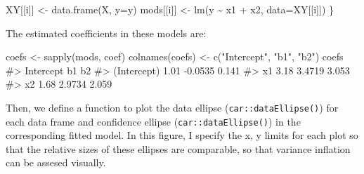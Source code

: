 \documentclass[
  letterpaper,
  10pt,
  krantz2]{krantz}
\makeatletter
\newenvironment{Shaded}{\begin{snugshade}}{\end{snugshade}}
\newcommand{\AttributeTok}[1]{\textcolor[rgb]{0.40,0.45,0.13}{#1}}
\newcommand{\CommentTok}[1]{\textcolor[rgb]{0.37,0.37,0.37}{#1}}
\newcommand{\FunctionTok}[1]{\textcolor[rgb]{0.28,0.35,0.67}{#1}}
\newcommand{\NormalTok}[1]{\textcolor[rgb]{0.00,0.23,0.31}{#1}}
\newcommand{\OtherTok}[1]{\textcolor[rgb]{0.00,0.23,0.31}{#1}}
\newcommand{\SpecialCharTok}[1]{\textcolor[rgb]{0.37,0.37,0.37}{#1}}
\newcommand{\StringTok}[1]{\textcolor[rgb]{0.13,0.47,0.30}{#1}}
\newenvironment{kframe}{%
  \medskip{}
  \setlength{\fboxsep}{.8em}
  \def\at@end@of@kframe{}%
  \ifinner\ifhmode%
  \def\at@end@of@kframe{\end{minipage}}%
  \begin{minipage}{\columnwidth}%
  \fi\fi%
  \def\FrameCommand##1{\hskip\@totalleftmargin \hskip-\fboxsep
  \colorbox{shadecolor}{##1}\hskip-\fboxsep
      \hskip-\linewidth \hskip-\@totalleftmargin \hskip\columnwidth}%
  \MakeFramed {\advance\hsize-\width
    \@totalleftmargin\z@ \linewidth\hsize
    \@setminipage}}%
{\par\unskip\endMakeFramed%
  \at@end@of@kframe}
\renewenvironment{Shaded}{\begin{kframe}}{\end{kframe}}
\makeatother
\begin{document}
\begin{Shaded}
\begin{Highlighting}[]
\NormalTok{  XY[[i]] }\OtherTok{\textless{}{-}} \FunctionTok{data.frame}\NormalTok{(X, }\AttributeTok{y=}\NormalTok{y)}
\NormalTok{  mods[[i]] }\OtherTok{\textless{}{-}} \FunctionTok{lm}\NormalTok{(y }\SpecialCharTok{\textasciitilde{}}\NormalTok{ x1 }\SpecialCharTok{+}\NormalTok{ x2, }\AttributeTok{data=}\NormalTok{XY[[i]])}
\NormalTok{\}}
\end{Highlighting}
\end{Shaded}

The estimated coefficients in these models are:

\begin{Shaded}
\begin{Highlighting}[]
\NormalTok{coefs }\OtherTok{\textless{}{-}} \FunctionTok{sapply}\NormalTok{(mods, coef)}
\FunctionTok{colnames}\NormalTok{(coefs) }\OtherTok{\textless{}{-}} \FunctionTok{c}\NormalTok{(}\StringTok{"Intercept"}\NormalTok{, }\StringTok{"b1"}\NormalTok{, }\StringTok{"b2"}\NormalTok{)}
\NormalTok{coefs}
\CommentTok{\#\textgreater{}             Intercept      b1    b2}
\CommentTok{\#\textgreater{} (Intercept)      1.01 {-}0.0535 0.141}
\CommentTok{\#\textgreater{} x1               3.18  3.4719 3.053}
\CommentTok{\#\textgreater{} x2               1.68  2.9734 2.059}
\end{Highlighting}
\end{Shaded}

Then, we define a function to plot the data ellipse
(\texttt{car::dataEllipse()}) for each data frame and confidence ellipse
(\texttt{car::dataEllipse()}) in the corresponding fitted model. In this
figure, I specify the x, y limits for each plot so that the relative
sizes of these ellipses are comparable, so that variance inflation can
be assesed visually.
\end{document}
